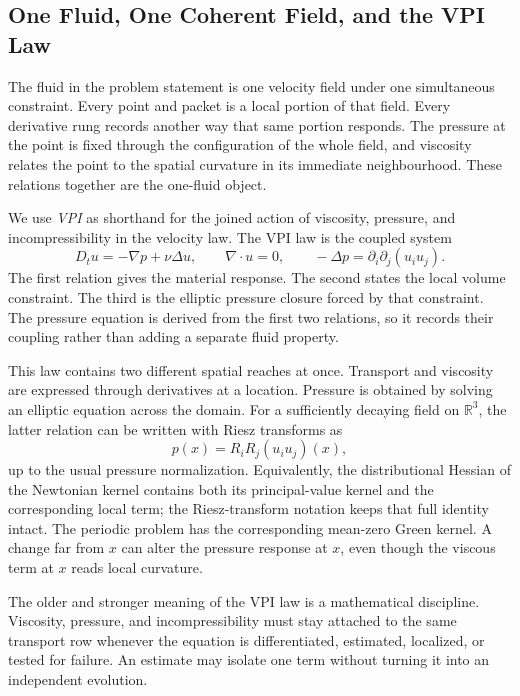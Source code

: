 \subsection{One Fluid, One Coherent Field, and the VPI Law}\label{sub:OneFluidOneCoherentFieldAndTheVPILaw}

The fluid in the problem statement is one velocity field under one simultaneous constraint.
Every point and packet is a local portion of that field.
Every derivative rung records another way that same portion responds.
The pressure at the point is fixed through the configuration of the whole field, and viscosity relates the point to the spatial curvature in its immediate neighbourhood.
These relations together are the one-fluid object.

We use \emph{VPI} as shorthand for the joined action of viscosity, pressure, and incompressibility in the velocity law.
The VPI law is the coupled system
\[
  D_tu=-\nabla p+\nu\Delta u,
  \qquad
  \nabla\cdot u=0,
  \qquad
  -\Delta p=\partial_i\partial_j(u_i u_j).
\]
The first relation gives the material response.
The second states the local volume constraint.
The third is the elliptic pressure closure forced by that constraint.
The pressure equation is derived from the first two relations, so it records their coupling rather than adding a separate fluid property.

This law contains two different spatial reaches at once.
Transport and viscosity are expressed through derivatives at a location.
Pressure is obtained by solving an elliptic equation across the domain.
For a sufficiently decaying field on \(\mathbb R^3\), the latter relation can be written with Riesz transforms as
\[
  p(x)
  =
  R_iR_j(u_i u_j)(x),
\]
up to the usual pressure normalization.
Equivalently, the distributional Hessian of the Newtonian kernel contains both its principal-value kernel and the corresponding local term; the Riesz-transform notation keeps that full identity intact.
The periodic problem has the corresponding mean-zero Green kernel.
A change far from \(x\) can alter the pressure response at \(x\), even though the viscous term at \(x\) reads local curvature.


The older and stronger meaning of the VPI law is a mathematical discipline.
Viscosity, pressure, and incompressibility must stay attached to the same transport row whenever the equation is differentiated, estimated, localized, or tested for failure.
An estimate may isolate one term without turning it into an independent evolution.

